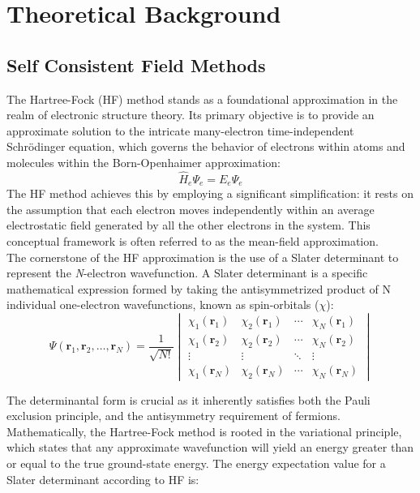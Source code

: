 \chapter{Theoretical Background}\label{ch:theory}

\section{Self Consistent Field Methods} \label{sec:SCF}
The Hartree-Fock (HF) method stands as a foundational approximation in the realm of electronic structure theory. Its primary objective is to provide an approximate solution to the intricate many-electron time-independent Schrödinger equation, which governs the behavior of electrons within atoms and molecules within the Born-Openhaimer approximation:\\
\begin{equation}\label{eq:TISE}
    \hat{H}_e \Psi_e = E_e \Psi_e
\end{equation}
The HF method achieves this by employing a significant simplification: it rests on the assumption that each electron moves independently within an average electrostatic field generated by all the other electrons in the system. This conceptual framework is often referred to as the mean-field approximation.\\
The cornerstone of the HF approximation is the use of a Slater determinant to represent the \textit{N}-electron wavefunction. A Slater determinant is a specific mathematical expression formed by taking the antisymmetrized product of N individual one-electron wavefunctions, known as spin-orbitals ($\chi$):\\

\begin{equation}\label{eq:SlaterDet}
    \Psi(\mathbf{r}_1, \mathbf{r}_2, \dots, \mathbf{r}_N) = \frac{1}{\sqrt{N!}}
    \begin{vmatrix}
      \chi_1(\mathbf{r}_1) & \chi_2(\mathbf{r}_1) & \cdots & \chi_N(\mathbf{r}_1) \\
      \chi_1(\mathbf{r}_2) & \chi_2(\mathbf{r}_2) & \cdots & \chi_N(\mathbf{r}_2) \\
      \vdots & \vdots & \ddots & \vdots \\
      \chi_1(\mathbf{r}_N) & \chi_2(\mathbf{r}_N) & \cdots & \chi_N(\mathbf{r}_N)
    \end{vmatrix}
  \end{equation}

The determinantal form is crucial as it inherently satisfies both the Pauli exclusion principle, and the antisymmetry requirement of fermions. Mathematically, the Hartree-Fock method is rooted in the variational principle, which states that any approximate wavefunction will yield an energy greater than or equal to the true ground-state energy. The energy expectation value for a Slater determinant according to HF is:


